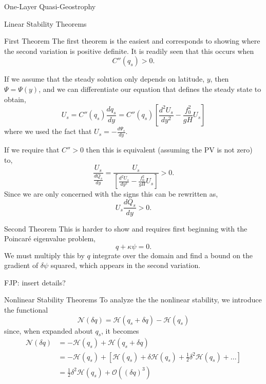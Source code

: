 \documentclass[12pt]{article}
\begin{document}
\begin{section}{One-Layer Quasi-Geostrophy}
\begin{subsection}{Linear Stability Theorems}
        \begin{subsubsection}{First Theorem}
            The first theorem is the easiest and corresponds to showing where the second variation is positive definite.  It is readily seen that this occurs when
            $$
            C''(q_s) > 0.
            $$

            If we assume that the steady solution only depends on latitude, $y$, then $\Psi = \Psi(y)$, and we can differentiate our equation that defines the steady state to obtain,
            $$
            U_s = C''(q_s) \frac{dq_s}{dy} = C''(q_s) \left[ \frac{d^2 U_s}{dy^2} - \frac{f_0^2}{gH} U_s \right]
            $$
            where we used the fact that $U_s = - \frac{d \Psi_s}{dy}$.

            If we require that $C'' > 0$ then this is equivalent (assuming the PV is not zero) to,
            $$
            \frac{U_s}{\frac{dQ_s}{dy}} = \frac{U_s}{\left[ \frac{d^2 U_s}{dy^2} - \frac{f_0^2}{gH} U_s\right]} > 0.
            $$
            Since we are only concerned with the signs this can be rewritten as,
            $$
            U_s \frac{d Q_s}{dy} > 0.
            $$
        \end{subsubsection}

        \begin{subsubsection}{Second Theorem}
            This is harder to show and requires first beginning with the Poincar\'e eigenvalue problem,
            $$
            q + \kappa \psi = 0.
            $$
            We must multiply this by $q$ integrate over the domain and find a bound on the gradient of $\delta \psi$ squared, which appears in the second variation.

            FJP: insert details?
        \end{subsubsection}
    \end{subsection}

    \begin{subsection}{Nonlinear Stability Theorems}
        To analyze the the nonlinear stability, we introduce the functional
        $$
        \mathcal{N}(\delta q)  = \mathcal{H}(q_s + \delta q) - \mathcal{H}(q_s)
        $$
        since, when expanded about $q_s$, it becomes
        \begin{align*}
            \mathcal{N}(\delta q)
            &= - \mathcal{H}(q_s) + \mathcal{H}(q_s + \delta q) \\
            & = - \mathcal{H}(q_s) + \left[ \mathcal{H}(q_s) + \delta \mathcal{H}(q_s)+ \frac12 \delta^2 \mathcal{H}(q_s) + ... \right] \\
            &= \frac12 \delta^2 \mathcal{H}(q_s) + \mathcal{O}((\delta q)^3)
        \end{align*}


\end{subsection}
\end{section}
\end{document}
